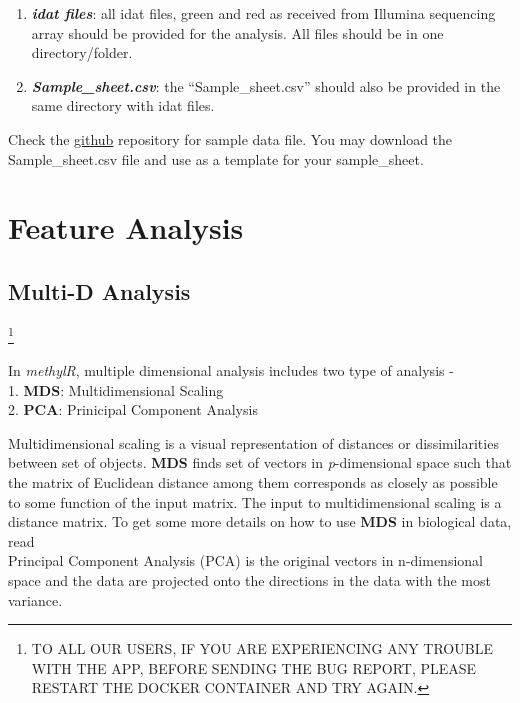 \documentclass[
  a4paper,
  DIV=11,
  numbers=noendperiod,
  oneside,
  open=any]{scrreport}
\providecommand{\tightlist}{%
  \setlength{\itemsep}{0pt}\setlength{\parskip}{0pt}}\usepackage{longtable,booktabs,array}
\begin{document}
\begin{enumerate}
\def\labelenumi{\arabic{enumi}.}
\tightlist
\item
  \textbf{\emph{idat files}}: all idat files, green and red as received
  from Illumina sequencing array should be provided for the analysis.
  All files should be in one directory/folder.
\item
  \textbf{\emph{Sample\_sheet.csv}}: the ``Sample\_sheet.csv'' should
  also be provided in the same directory with idat files.
\end{enumerate}

\begin{tcolorbox}[enhanced jigsaw, breakable, colback=white, colbacktitle=quarto-callout-tip-color!10!white, opacityback=0, left=2mm, bottomrule=.15mm, opacitybacktitle=0.6, coltitle=black, bottomtitle=1mm, toprule=.15mm, toptitle=1mm, arc=.35mm, titlerule=0mm, rightrule=.15mm, title=\textcolor{quarto-callout-tip-color}{\faLightbulb}\hspace{0.5em}{Tip}, colframe=quarto-callout-tip-color-frame, leftrule=.75mm]

Check the
\href{https://github.com/JD2112/methylr/tree/main/data}{github}
repository for sample data file. You may download the Sample\_sheet.csv
file and use as a template for your sample\_sheet.

\end{tcolorbox}

\part{Feature Analysis}

\chapter{Multi-D Analysis}\label{sec-multid}

\footnote{TO ALL OUR USERS, IF YOU ARE EXPERIENCING ANY TROUBLE WITH THE
  APP, BEFORE SENDING THE BUG REPORT, PLEASE RESTART THE DOCKER
  CONTAINER AND TRY AGAIN.}

In \emph{methylR}, multiple dimensional analysis includes two type of
analysis -\\
1. \textbf{MDS}: Multidimensional Scaling\\
2. \textbf{PCA}: Prinicipal Component Analysis

Multidimensional scaling is a visual representation of distances or
dissimilarities between set of objects. \textbf{MDS} finds set of
vectors in \emph{p}-dimensional space such that the matrix of Euclidean
distance among them corresponds as closely as possible to some function
of the input matrix. The input to multidimensional scaling is a distance
matrix. To get some more details on how to use \textbf{MDS} in
biological data, read
\autocite{mugavin2008multidimensional,lacher1987interpretation,lacher1988comparison}\\
Principal Component Analysis (PCA) is the original vectors in
n-dimensional space and the data are projected onto the directions in
the data with the most variance.
\end{document}
